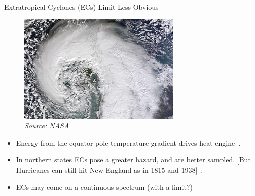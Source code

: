 \begin{frame}{Extratropical Cyclones (ECs) Limit Less Obvious}
\begin{figure}[htb!]
\includegraphics[width=0.4\linewidth]{images/ukstorm_tmo_2014043_tn.jpg}\\
\textit{Source: NASA}
\end{figure}
\begin{itemize}
\item Energy from the equator-pole temperature gradient drives heat engine~\cite{lorenz1960energy, holton2004introduction}.
\item In northern states  ECs pose a greater hazard, and are better sampled.
[But Hurricanes can still hit New England as in 1815 and 1938]~\cite{emanuel2005divine}.
\item ECs may come on a continuous spectrum (with a limit?)
\end{itemize}


\end{frame}
